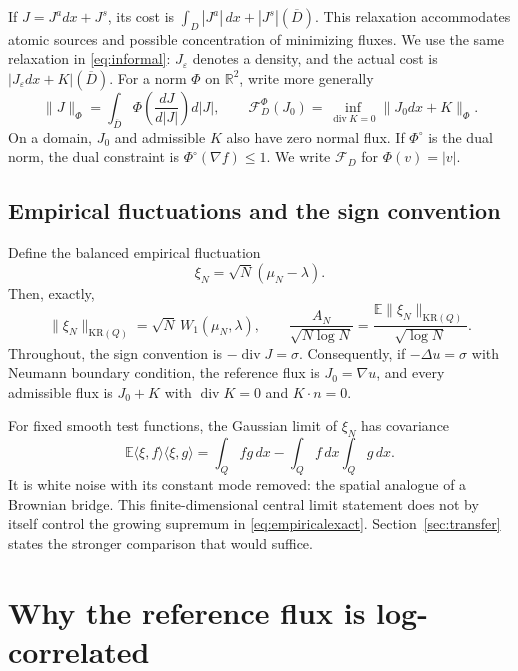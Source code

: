 \documentclass[11pt]{article}
\theoremstyle{definition}
\newcommand{\R}{\mathbb R}
\newcommand{\E}{\mathbb E}
\newcommand{\diver}{\operatorname{div}}
\newcommand{\KR}{\mathrm{KR}}
\newcommand{\cF}{\mathcal F}
\newcommand{\dd}{\,dx}
\begin{document}
If $J=J^a dx+J^s$, its cost is
$\int_D|J^a|\dd+|J^s|(\overline D)$. This relaxation accommodates atomic
sources and possible concentration of minimizing fluxes. We use the
same relaxation in \eqref{eq:informal}: $J_\varepsilon$ denotes a density,
and the actual cost is $|J_\varepsilon dx+K|(\overline D)$. For a norm
$\Phi$ on $\R^2$, write more generally
\[
  \|J\|_\Phi
  =\int_{\overline D}\Phi\!\left(\frac{dJ}{d|J|}\right)d|J|,
  \qquad
  \cF_D^\Phi(J_0)=\inf_{\diver K=0}\|J_0dx+K\|_\Phi.
\]
On a domain, $J_0$ and admissible $K$ also have zero normal flux. If
$\Phi^\circ$ is the dual norm, the dual constraint is
$\Phi^\circ(\nabla f)\leq1$. We write $\cF_D$ for $\Phi(v)=|v|$.

\subsection{Empirical fluctuations and the sign convention}
Define the balanced empirical fluctuation
\[
  \xi_N=\sqrt N(\mu_N-\lambda).
\]
Then, exactly,
\begin{equation}\label{eq:empiricalexact}
  \|\xi_N\|_{\KR(Q)}=\sqrt N\,W_1(\mu_N,\lambda),
  \qquad
  \frac{A_N}{\sqrt{N\log N}}
  =\frac{\E\|\xi_N\|_{\KR(Q)}}{\sqrt{\log N}}.
\end{equation}
Throughout, the sign convention is $-\diver J=\sigma$. Consequently,
if $-\Delta u=\sigma$ with Neumann boundary condition, the reference flux
is $J_0=\nabla u$, and every admissible flux is $J_0+K$ with
$\diver K=0$ and $K\cdot n=0$.

For fixed smooth test functions, the Gaussian limit of $\xi_N$ has
covariance
\begin{equation}\label{eq:bridge}
  \E\langle\xi,f\rangle\langle\xi,g\rangle
  =\int_Qfg\dd-\int_Qf\dd\int_Qg\dd.
\end{equation}
It is white noise with its constant mode removed: the spatial analogue
of a Brownian bridge. This finite-dimensional central limit statement
does not by itself control the growing supremum in
\eqref{eq:empiricalexact}. Section~\ref{sec:transfer} states the stronger
comparison that would suffice.

\section{Why the reference flux is log-correlated}
\label{sec:gaussian}
\end{document}
